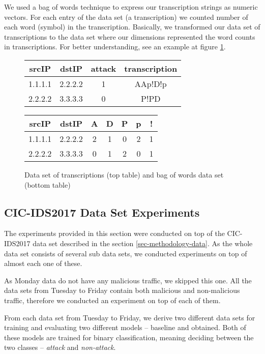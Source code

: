 \documentclass{article}
\begin{document}
We used a bag of words technique to express our transcription strings as numeric vectors. For each entry of the data set (a transcription) we counted number of each word (symbol) in the transcription. Basically, we transformed our data set of transcriptions to the data set where our dimensions represented the word counts in transcriptions. For better understanding, see an example at figure \ref{fig-bag-of-words-example}.

\begin{figure}[h!]
\centering
\begin{tabular}{ |c|c|c|c| }
 \hline
 srcIP & dstIP & attack & transcription \\
 \hline
 1.1.1.1 & 2.2.2.2 & 1 & AAp!D!p \\
 2.2.2.2 & 3.3.3.3 & 0 & P!PD \\
 \hline
\end{tabular}

\vspace{0.3cm}

\begin{tabular}{ |c|c|c|c|c|c|c| }
 \hline
 srcIP & dstIP & A & D & P & p & ! \\
 \hline
 1.1.1.1 & 2.2.2.2 & 2 & 1 & 0 & 2 & 1 \\
 2.2.2.2 & 3.3.3.3 & 0 & 1 & 2 & 0 & 1 \\
 \hline
\end{tabular}
\caption{Data set of transcriptions (top table) and bag of words data set (bottom table)}
\label{fig-bag-of-words-example}
\end{figure}


\subsection{CIC-IDS2017 Data Set Experiments}\label{sec-cic-ids-experiments}

The experiments provided in this section were conducted on top of the CIC-IDS2017 data set described in the section \ref{sec-methodology-data}. As the whole data set consists of several sub data sets, we conducted experiments on top of almost each one of these.

As Monday data do not have any malicious traffic, we skipped this one. All the data sets from Tuesday to Friday contain both malicious and non-malicious traffic, therefore we conducted an experiment on top of each of them.

From each data set from Tuesday to Friday, we derive two different data sets for training and evaluating two different models -- baseline and obtained. Both of these models are trained for binary classification, meaning deciding between the two classes -- \textit{attack} and \textit{non-attack}.
\end{document}

